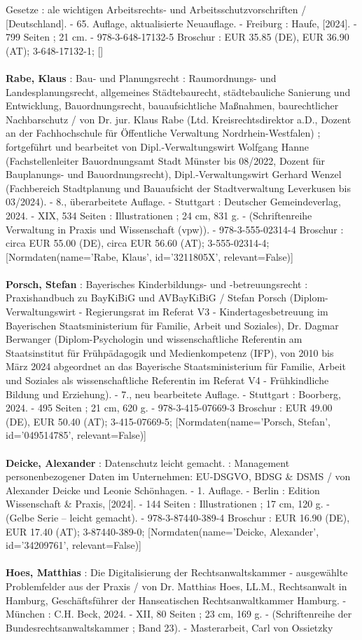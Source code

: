 \documentclass{article}
\begin{document}
\begin{multicols}{3}
Gesetze : ale wichtigen Arbeitsrechts- und Arbeitsschutzvorschriften / [Deutschland]. - 65. Auflage, aktualisierte Neuauflage. - Freiburg : Haufe, [2024]. - 799 Seiten ; 21 cm. - 978-3-648-17132-5 Broschur : EUR 35.85 (DE), EUR 36.90 (AT); 3-648-17132-1; []\\\\\textbf{Rabe, Klaus} : Bau- und Planungsrecht : Raumordnungs- und Landesplanungsrecht, allgemeines Städtebaurecht, städtebauliche Sanierung und Entwicklung, Bauordnungsrecht, bauaufsichtliche Maßnahmen, baurechtlicher Nachbarschutz / von Dr. jur. Klaus Rabe (Ltd. Kreisrechtsdirektor a.D., Dozent an der Fachhochschule für Öffentliche Verwaltung Nordrhein-Westfalen) ; fortgeführt und bearbeitet von Dipl.-Verwaltungswirt Wolfgang Hanne (Fachstellenleiter Bauordnungsamt Stadt Münster bis 08/2022, Dozent für Bauplanungs- und Bauordnungsrecht), Dipl.-Verwaltungswirt Gerhard Wenzel (Fachbereich Stadtplanung und Bauaufsicht der Stadtverwaltung Leverkusen bis 03/2024). - 8., überarbeitete Auflage. - Stuttgart : Deutscher Gemeindeverlag, 2024. - XIX, 534 Seiten : Illustrationen ; 24 cm, 831 g. - (Schriftenreihe Verwaltung in Praxis und Wissenschaft (vpw)). - 978-3-555-02314-4 Broschur : circa EUR 55.00 (DE), circa EUR 56.60 (AT); 3-555-02314-4; [Normdaten(name='Rabe, Klaus', id='3211805X', relevant=False)]\\\\\textbf{Porsch, Stefan} : Bayerisches Kinderbildungs- und -betreuungsrecht : Praxishandbuch zu BayKiBiG und AVBayKiBiG / Stefan Porsch (Diplom-Verwaltungswirt - Regierungsrat im Referat V3 - Kindertagesbetreuung im Bayerischen Staatsministerium für Familie, Arbeit und Soziales), Dr. Dagmar Berwanger (Diplom-Psychologin und wissenschaftliche Referentin am Staatsinstitut für Frühpädagogik und Medienkompetenz (IFP), von 2010 bis März 2024 abgeordnet an das Bayerische Staatsministerium für Familie, Arbeit und Soziales als wissenschaftliche Referentin im Referat V4 - Frühkindliche Bildung und Erziehung). - 7., neu bearbeitete Auflage. - Stuttgart : Boorberg, 2024. - 495 Seiten ; 21 cm, 620 g. - 978-3-415-07669-3 Broschur : EUR 49.00 (DE), EUR 50.40 (AT); 3-415-07669-5; [Normdaten(name='Porsch, Stefan', id='049514785', relevant=False)]\\\\\textbf{Deicke, Alexander} : Datenschutz leicht gemacht. : Management personenbezogener Daten im Unternehmen: EU-DSGVO, BDSG \& DSMS / von Alexander Deicke und Leonie Schönhagen. - 1. Auflage. - Berlin : Edition Wissenschaft \& Praxis, [2024]. - 144 Seiten : Illustrationen ; 17 cm, 120 g. - (Gelbe Serie – leicht gemacht). - 978-3-87440-389-4 Broschur : EUR 16.90 (DE), EUR 17.40 (AT); 3-87440-389-0; [Normdaten(name='Deicke, Alexander', id='34209761', relevant=False)]\\\\\textbf{Hoes, Matthias} : Die Digitalisierung der Rechtsanwaltskammer - ausgewählte Problemfelder aus der Praxis / von Dr. Matthias Hoes, LL.M., Rechtsanwalt in Hamburg, Geschäftsführer der Hanseatischen Rechtsanwaltkammer Hamburg. - München : C.H. Beck, 2024. - XII, 80 Seiten ; 23 cm, 169 g. - (Schriftenreihe der Bundesrechtsanwaltskammer ; Band 23). - Masterarbeit, Carl von Ossietzky 
\end{multicols}
\end{document}
